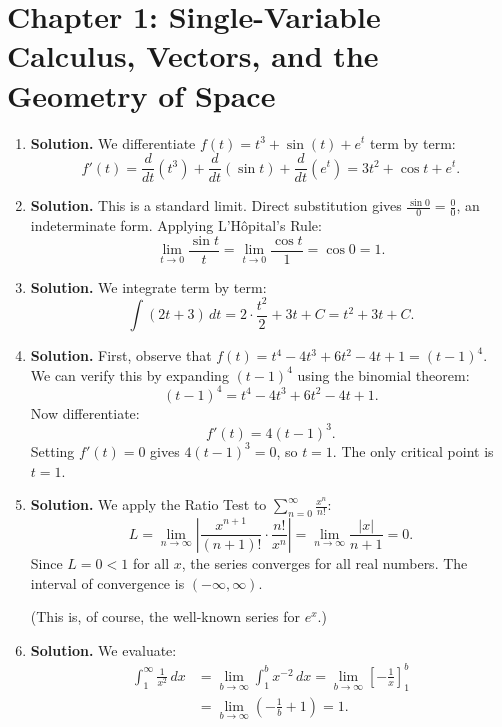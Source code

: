 \chapter{Chapter 1: Single-Variable Calculus, Vectors, and the Geometry of Space}

\begin{enumerate}

\item \textbf{Solution.}
We differentiate \( f(t) = t^3 + \sin(t) + e^t \) term by term:
\[
f'(t) = \frac{d}{dt}(t^3) + \frac{d}{dt}(\sin t) + \frac{d}{dt}(e^t) = 3t^2 + \cos t + e^t.
\]

\item \textbf{Solution.}
This is a standard limit. Direct substitution gives \( \frac{\sin 0}{0} = \frac{0}{0} \), an indeterminate form. Applying L'H\^opital's Rule:
\[
\lim_{t \to 0} \frac{\sin t}{t} = \lim_{t \to 0} \frac{\cos t}{1} = \cos 0 = 1.
\]

\item \textbf{Solution.}
We integrate term by term:
\[
\int (2t + 3)\, dt = 2 \cdot \frac{t^2}{2} + 3t + C = t^2 + 3t + C.
\]

\item \textbf{Solution.}
First, observe that \( f(t) = t^4 - 4t^3 + 6t^2 - 4t + 1 = (t-1)^4 \). We can verify this by expanding \( (t-1)^4 \) using the binomial theorem:
\[
(t-1)^4 = t^4 - 4t^3 + 6t^2 - 4t + 1.
\]
Now differentiate:
\[
f'(t) = 4(t-1)^3.
\]
Setting \( f'(t) = 0 \) gives \( 4(t-1)^3 = 0 \), so \( t = 1 \). The only critical point is \( t = 1 \).

\item \textbf{Solution.}
We apply the Ratio Test to \( \displaystyle\sum_{n=0}^{\infty} \frac{x^n}{n!} \):
\[
L = \lim_{n \to \infty} \left| \frac{x^{n+1}}{(n+1)!} \cdot \frac{n!}{x^n} \right| = \lim_{n \to \infty} \frac{|x|}{n+1} = 0.
\]
Since \( L = 0 < 1 \) for all \( x \), the series converges for all real numbers. The interval of convergence is \( (-\infty, \infty) \).

(This is, of course, the well-known series for \( e^x \).)

\item \textbf{Solution.}
We evaluate:
\begin{align*}
\int_{1}^{\infty} \frac{1}{x^2}\, dx &= \lim_{b \to \infty} \int_{1}^{b} x^{-2}\, dx = \lim_{b \to \infty} \left[ -\frac{1}{x} \right]_1^b \\
&= \lim_{b \to \infty} \left( -\frac{1}{b} + 1 \right) = 1.
\end{align*}


\end{enumerate}
